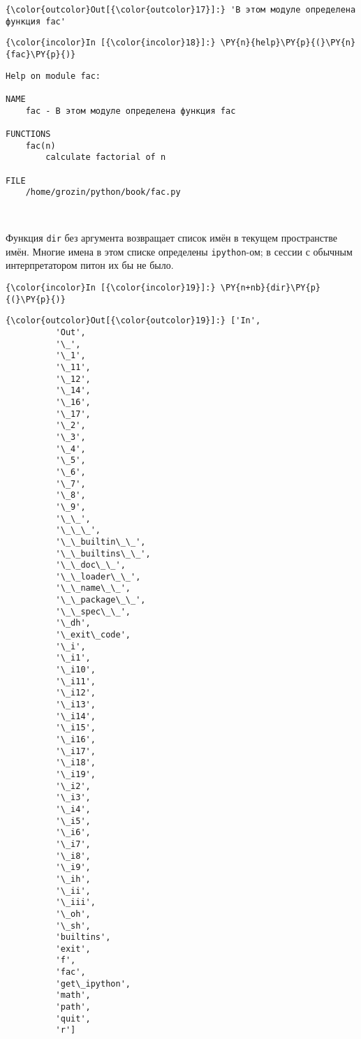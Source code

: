             \begin{Verbatim}[commandchars=\\\{\}]
{\color{outcolor}Out[{\color{outcolor}17}]:} 'В этом модуле определена функция fac'
\end{Verbatim}
        
    \begin{Verbatim}[commandchars=\\\{\}]
{\color{incolor}In [{\color{incolor}18}]:} \PY{n}{help}\PY{p}{(}\PY{n}{fac}\PY{p}{)}
\end{Verbatim}

    \begin{Verbatim}[commandchars=\\\{\}]
Help on module fac:

NAME
    fac - В этом модуле определена функция fac

FUNCTIONS
    fac(n)
        calculate factorial of n

FILE
    /home/grozin/python/book/fac.py



    \end{Verbatim}

    Функция \texttt{dir} без аргумента возвращает список имён в текущем
пространстве имён. Многие имена в этом списке определены
\texttt{ipython}-ом; в сессии с обычным интерпретатором питон их бы не
было.

    \begin{Verbatim}[commandchars=\\\{\}]
{\color{incolor}In [{\color{incolor}19}]:} \PY{n+nb}{dir}\PY{p}{(}\PY{p}{)}
\end{Verbatim}

            \begin{Verbatim}[commandchars=\\\{\}]
{\color{outcolor}Out[{\color{outcolor}19}]:} ['In',
          'Out',
          '\_',
          '\_1',
          '\_11',
          '\_12',
          '\_14',
          '\_16',
          '\_17',
          '\_2',
          '\_3',
          '\_4',
          '\_5',
          '\_6',
          '\_7',
          '\_8',
          '\_9',
          '\_\_',
          '\_\_\_',
          '\_\_builtin\_\_',
          '\_\_builtins\_\_',
          '\_\_doc\_\_',
          '\_\_loader\_\_',
          '\_\_name\_\_',
          '\_\_package\_\_',
          '\_\_spec\_\_',
          '\_dh',
          '\_exit\_code',
          '\_i',
          '\_i1',
          '\_i10',
          '\_i11',
          '\_i12',
          '\_i13',
          '\_i14',
          '\_i15',
          '\_i16',
          '\_i17',
          '\_i18',
          '\_i19',
          '\_i2',
          '\_i3',
          '\_i4',
          '\_i5',
          '\_i6',
          '\_i7',
          '\_i8',
          '\_i9',
          '\_ih',
          '\_ii',
          '\_iii',
          '\_oh',
          '\_sh',
          'builtins',
          'exit',
          'f',
          'fac',
          'get\_ipython',
          'math',
          'path',
          'quit',
          'r']
\end{Verbatim}
        
